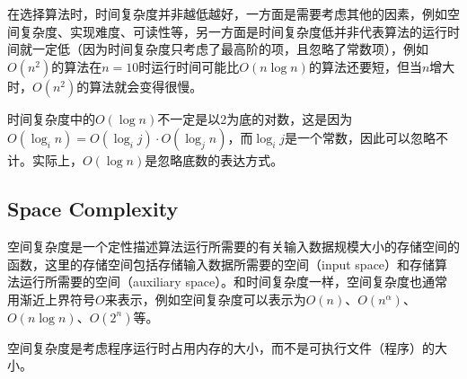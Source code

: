 在选择算法时，时间复杂度并非越低越好，一方面是需要考虑其他的因素，例如空间复杂度、实现难度、可读性等，另一方面是时间复杂度低并非代表算法的运行时间就一定低（因为时间复杂度只考虑了最高阶的项，且忽略了常数项），例如$O(n^2)$的算法在$n=10$时运行时间可能比$O(n\log n)$的算法还要短，但当$n$增大时，$O(n^2)$的算法就会变得很慢。

时间复杂度中的$O(\log n)$不一定是以2为底的对数，这是因为$O(\log_i n) = O(\log_i j) \cdot O(\log_j n)$，而$\log_i j$是一个常数，因此可以忽略不计。实际上，$O(\log n)$是忽略底数的表达方式。

\subsection{Space Complexity}
空间复杂度是一个定性描述算法运行所需要的有关输入数据规模大小的存储空间的函数，这里的存储空间包括存储输入数据所需要的空间（input space）和存储算法运行所需要的空间（auxiliary space）。和时间复杂度一样，空间复杂度也通常用渐近上界符号$O$来表示，例如空间复杂度可以表示为$O(n)$、$O(n^{\alpha})$、$O(n \log n)$、$O(2^n)$等。

空间复杂度是考虑程序运行时占用内存的大小，而不是可执行文件（程序）的大小。
